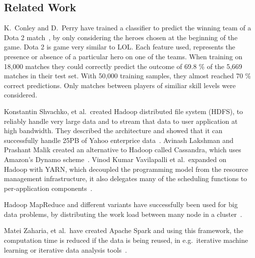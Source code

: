 \subsection{Related Work}\label{sec:relatedwork}
K.\ Conley and D.\ Perry have trained a classifier to predict the winning team of a Dota 2 match~\cite{dota2article}, by only considering the heroes chosen at the beginning of the game. Dota 2 is game very similar to LOL.\@
Each feature used, represents the presence or absence of a particular hero on one of the teams.
When training on 18,000 matches they could correctly predict the outcome of 69.8 \% of the 5,669 matches in their test set.
With 50,000 training samples, they almost reached 70 \% correct predictions. Only matches between players of similiar skill levels were considered.

Konstantin Shvachko, et al.\, created Hadoop distributed file system (HDFS), to reliably handle very large data and to stream that data to user application at high bandwidth. They described the architecture and showed that it can successfully handle 25PB of Yahoo enterprice data~\cite{HDFS}.
Avinash Lakshman and Prashant Malik created an alternative to Hadoop called Cassandra, which uses Amazon's Dynamo scheme~\cite{ApacheCassandra}.
Vinod Kumar Vavilapalli et al.\ expanded on Hadoop with YARN, which decoupled the programming model from the resource management infrastructure, it also delegates many of the scheduling functions to per-application components~\cite{ApacheHadoopYARN}.

Hadoop MapReduce and different variants have successfully been used for big data problems, by distributing the work load between many node in a cluster~\cite{DeanMapReduce}. 


Matei Zaharia, et al.\ have created Apache Spark and using this framework, the computation time is reduced if the data is being reused, in e.g.\ iterative machine learning or iterative data analysis tools~\cite{ApacheSpark}. 



